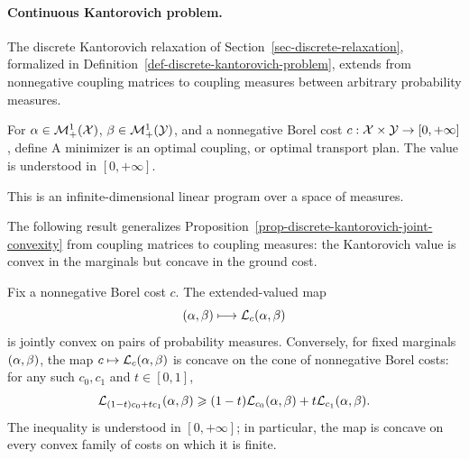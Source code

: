\paragraph{Continuous Kantorovich problem.}

The discrete Kantorovich relaxation of Section~\ref{sec-discrete-relaxation}, formalized in Definition~\ref{def-discrete-kantorovich-problem}, extends from nonnegative coupling matrices to coupling measures between arbitrary probability measures.
\begin{defn}\label{def-continuous-kantorovich-problem}
For $\alpha\in\mathcal{M}_+^1(\mathcal{X})$, $\beta\in\mathcal{M}_+^1(\mathcal{Y})$, and a nonnegative Borel cost $c:\mathcal{X}\times\mathcal{Y}\to[0,+\infty]$, define
A minimizer is an optimal coupling, or optimal transport plan.
The value is understood in $[0,+\infty]$.
\end{defn}
This is an infinite-dimensional linear program over a space of measures.

The following result generalizes Proposition~\ref{prop-discrete-kantorovich-joint-convexity} from coupling matrices to coupling measures: the Kantorovich value is convex in the marginals but concave in the ground cost.

\begin{prop}\label{prop-kantorovich-value-curvature}
	Fix a nonnegative Borel cost $c$. The extended-valued map
	\[
		(\alpha,\beta)\longmapsto\mathcal{L}_c(\alpha,\beta)
	\]
	is jointly convex on pairs of probability measures. Conversely, for fixed marginals $(\alpha,\beta)$, the map $c\mapsto\mathcal{L}_c(\alpha,\beta)$ is concave on the cone of nonnegative Borel costs: for any such $c_0,c_1$ and $t\in[0,1]$,
	\[
		\mathcal{L}_{(1-t)c_0+tc_1}(\alpha,\beta)
		\geqslant
		(1-t)\mathcal{L}_{c_0}(\alpha,\beta)+t\mathcal{L}_{c_1}(\alpha,\beta).
	\]
	The inequality is understood in $[0,+\infty]$; in particular, the map is concave on every convex family of costs on which it is finite.
\end{prop}

